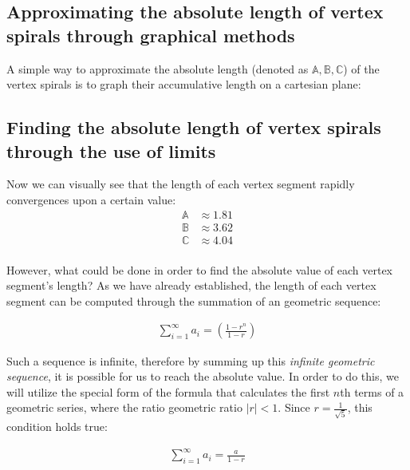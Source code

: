\subsection{Approximating the absolute length of vertex spirals through graphical methods}
A simple way to approximate the absolute length (denoted as $\mathbb{A}, \mathbb{B}, \mathbb{C}$) of the vertex spirals is to graph their accumulative length on a cartesian plane:



\subsection{Finding the absolute length of vertex spirals through the use of limits}
Now we can visually see that the length of each vertex segment rapidly convergences upon a certain value:
\begin{equation}
    \begin{aligned}
        \mathbb{A} &\approx 1.81 \\
        \mathbb{B} &\approx 3.62 \\
        \mathbb{C} &\approx 4.04 \\
    \end{aligned}
\end{equation}

\noindent
However, what could be done in order to find the absolute value of each vertex segment's length? As we have already established, the length of each vertex segment can be computed through the summation of an geometric sequence:

\begin{equation}
    \begin{aligned}
        \sum_{i=1}^{\infty}a_i = \left(\frac{1-r^n}{1-r}\right)
    \end{aligned}
\end{equation}

Such a sequence is infinite, therefore by summing up this \emph{infinite geometric sequence}, it is possible for us to reach the absolute value. In order to do this, we will utilize the special form of the formula that calculates the first $n$th terms of a geometric series, where the ratio geometric ratio $|r| < 1$. Since $r = \frac{1}{\sqrt{5}}$, this condition holds true:

\begin{equation}
    \begin{aligned}
        \sum_{i=1}^{\infty}a_i=\frac{a}{1-r}
    \end{aligned}
\end{equation}

